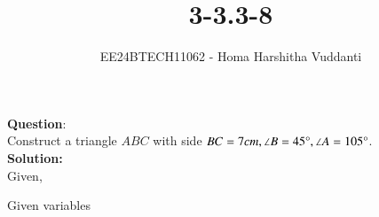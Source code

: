 \documentclass[journal]{IEEEtran}
\begin{document}

\vspace{3cm}

\title{3-3.3-8}
\author{EE24BTECH11062 - Homa Harshitha Vuddanti
}
{\let\newpage\relax\maketitle}

\renewcommand{\thefigure}{\theenumi}
\renewcommand{\thetable}{\theenumi}
\setlength{\intextsep}{10pt} %


\renewcommand{\thetable}{\theenumi}


\textbf{Question}:\\
Construct a triangle $ABC$ with side $BC = 7 cm, \angle{B}=45\degree , \angle{A}=105\degree$.   
\\
\textbf{Solution: }\\
Given,\\
\begin{table}[h!]    
  \centering
  
  \caption{Given variables}
  \label{3-3.3-8-table}
\end{table}
\end{document}
